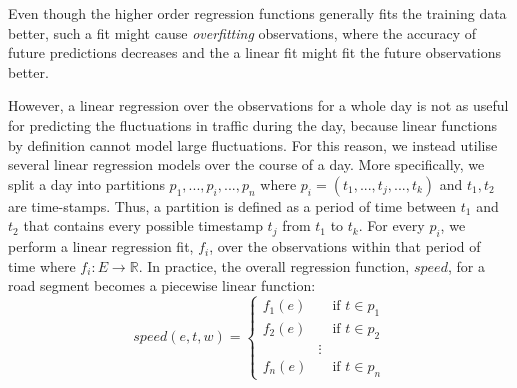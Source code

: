 Even though the higher order regression functions generally fits the training data better, such a fit might cause \emph{overfitting} observations, where the accuracy of future predictions decreases and the a linear fit might fit the future observations better. \par
However, a linear regression over the observations for a whole day is not as useful for predicting the fluctuations in traffic during the day, because linear functions by definition cannot model large fluctuations. For this reason, we instead utilise several linear regression models over the course of a day. More specifically, we split a day into partitions $p_1,...,p_i,...,p_n$ where $p_i = (t_1,...,t_j,...,t_k)$ and $t_1,t_2$ are time-stamps. Thus, a partition is defined as a period of time between $t_1$ and $t_2$ that contains every possible timestamp $t_j$ from $t_1$ to $t_k$. For every $p_i$, we perform a linear regression fit, $f_i$, over the observations within that period of time where $f_i:E \rightarrow \mathbb{R}$. In practice, the overall regression function, $speed$, for a road segment becomes a piecewise linear function:
\begin{equation}\label{eq:speed-piecewise}
speed(e,t, w) =
\begin{cases}
f_1(e)       & \quad \text{if } t \in p_1\\
f_2(e)  & \quad \text{if } t \in p_2\\
&\vdots\\
f_n(e) & \quad \text{if } t \in p_n
\end{cases}
\end{equation}

